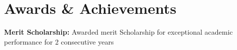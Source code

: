 \documentclass[12pt]{article}
\makeatletter
\newcommand{\resumeOrganizationHeading}[4]{
  \vspace{-2pt}\item
    \begin{tabular*}{0.97\textwidth}[t]{l@{\extracolsep{\fill}}r}
      \textbf{#1} & \textit{\small #2} \\
      \textit{\small#3}
    \end{tabular*}\vspace{-7pt}
}
\newcommand{\resumeSubHeadingListStart}{\begin{itemize}[leftmargin=0.15in, label={}]}
\newcommand{\resumeSubHeadingListEnd}{\end{itemize}}
\makeatother
\begin{document}
\section{Awards \& Achievements}
  \resumeSubHeadingListStart
    \small{\item{
        \textbf{Merit Scholarship:}{ Awarded merit Scholarship for exceptional academic performance for 2 consecutive years} \\ 
        }}
  \resumeSubHeadingListEnd




    
    




    
    








    



\end{document}
